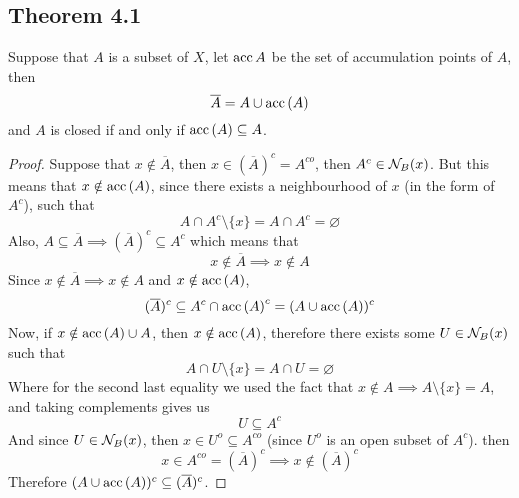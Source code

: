\documentclass[../../main.tex]{subfiles}
\begin{document}
\subsection{Theorem 4.1}
\begin{wts}
Suppose that $A$ is a subset of $X$, let $\operatorname{acc}{A}$ be the set of accumulation points of $A$, then
\begin{equation}
    \overline{A}=A\cup\operatorname{acc}{(A)}
\end{equation}
and $A$ is closed if and only if $\operatorname{acc}{(A)}\subseteq A$.
\end{wts}
\begin{proof}
Suppose that $x\notin \overline{A}$, then $x\in (\overline{A})^c=A^{co}$, then $A^c\in\mathcal{N}_B({x})$. But this means that $x\notin\operatorname{acc}{(A)}$, since there exists a neighbourhood of $x$ (in the form of $A^c$), such that 
\[
A\cap A^c\setminus\{x\}=A\cap A^c=\varnothing
\]
Also, $A\subseteq \overline{A}\implies (\overline{A})^c\subseteq A^c$ which means that
\[
x\notin \overline{A}\implies x\notin A
\]
Since $x\notin \overline{A}\implies x\notin A$ and $x\notin \operatorname{acc}{(A)}$,
\[
(\overline{A})^c\subseteq A^c\cap \operatorname{acc}{(A)}^c = (A\cup \operatorname{acc}{(A)})^c
\]
Now, if $x\notin \operatorname{acc}{(A)}\cup A$, then $x\notin\operatorname{acc}{(A)}$, therefore there exists some $U\in\mathcal{N}_B({x})$ such that 
\[
A\cap U\setminus\{x\} = A\cap U=\varnothing
\]
Where for the second last equality we used the fact that $x\notin A\implies A\setminus\{x\}=A$, and taking complements gives us
\[
U\subseteq A^c
\]
And since $U\in\mathcal{N}_B({x})$, then $x\in U^o\subseteq A^{co}$ (since $U^o$ is an open subset of $A^c$). then
\[
x\in A^{co} = (\overline{A})^c\implies x\notin (\overline{A})^c
\]
Therefore $(A\cup\operatorname{acc}{(A)})^c\subseteq (\overline{A})^c$.
\end{proof}
\end{document}
